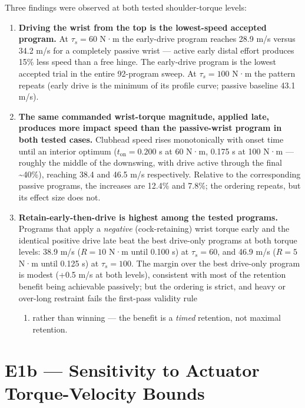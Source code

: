 \documentclass[
  letterpaper,
]{report}
\providecommand{\tightlist}{%
  \setlength{\itemsep}{0pt}\setlength{\parskip}{0pt}}
\begin{document}
Three findings were observed at both tested shoulder-torque levels:

\begin{enumerate}
\def\labelenumi{\arabic{enumi}.}
\item
  \textbf{Driving the wrist from the top is the lowest-speed accepted
  program.} At \(\tau_s = 60\) N·m the early-drive program reaches 28.9
  m/s versus 34.2 m/s for a completely passive wrist --- active early
  distal effort produces 15\% less speed than a free hinge. The
  early-drive program is the lowest accepted trial in the entire
  92-program sweep. At \(\tau_s = 100\) N·m the pattern repeats (early
  drive is the minimum of its profile curve; passive baseline 43.1 m/s).
\item
  \textbf{The same commanded wrist-torque magnitude, applied late,
  produces more impact speed than the passive-wrist program in both
  tested cases.} Clubhead speed rises monotonically with onset time
  until an interior optimum (\(t_{\mathrm{on}} = 0.200\) s at 60 N·m,
  0.175 s at 100 N·m --- roughly the middle of the downswing, with drive
  active through the final \textasciitilde40\%), reaching 38.4 and 46.5
  m/s respectively. Relative to the corresponding passive programs, the
  increases are 12.4\% and 7.8\%; the ordering repeats, but its effect
  size does not.
\item
  \textbf{Retain-early-then-drive is highest among the tested programs.}
  Programs that apply a \emph{negative} (cock-retaining) wrist torque
  early and the identical positive drive late beat the best drive-only
  programs at both torque levels: 38.9 m/s (\(R = 10\) N·m until 0.100
  s) at \(\tau_s = 60\), and 46.9 m/s (\(R = 5\) N·m until 0.125 s) at
  \(\tau_s = 100\). The margin over the best drive-only program is
  modest (+0.5 m/s at both levels), consistent with most of the
  retention benefit being achievable passively; but the ordering is
  strict, and heavy or over-long restraint fails the first-pass validity
  rule

  \begin{enumerate}
  \def\labelenumii{(\arabic{enumii})}
  \setcounter{enumii}{1}
  \tightlist
  \item
    rather than winning --- the benefit is a \emph{timed} retention, not
    maximal retention.
  \end{enumerate}
\end{enumerate}

\section{E1b --- Sensitivity to Actuator Torque-Velocity
Bounds}\label{sec-results-e1b}
\end{document}
